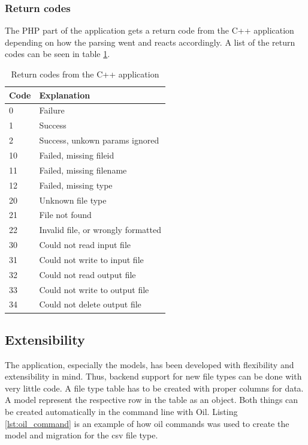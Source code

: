 \subsubsection{Return codes}
The PHP part of the application gets a return code from the C++ application depending on how the parsing went and reacts accordingly. A list of the return codes can be seen in table \ref{tab:cppReturnCodes}.
\begin{table}[htbp]
\centering
\begin{tabular}{|l|l|}
\hline
\textbf{Code} & \textbf{Explanation}\\
\hline
0 & Failure\\
\hline
1 & Success\\
\hline
2 & Success, unkown params ignored\\
\hline
10 & Failed, missing fileid\\
\hline
11 & Failed, missing filename\\
\hline
12 & Failed, missing type\\
\hline
20 & Unknown file type\\
\hline
21 & File not found\\
\hline
22 & Invalid file, or wrongly formatted\\
\hline
30 & Could not read input file\\
\hline
31 & Could not write to input file\\
\hline
32 & Could not read output file\\
\hline
33 & Could not write to output file\\
\hline
34 & Could not delete output file\\
\hline
\end{tabular}
\caption{Return codes from the C++ application}
\label{tab:cppReturnCodes}
\end{table}



\subsection{Extensibility}
\label{sec:extensibility}
The application, especially the models, has been developed with flexibility and extensibility in mind. Thus, backend support for new file types can be done with very little code. A file type table has to be created with proper columns for data. A \textsf{model} represent the respective row in the table as an object. Both things can be created automatically in the command line with \textsf{Oil}. Listing \ref{lst:oil_command} is an example of how oil commands was used to create the model and migration for the csv file type.

